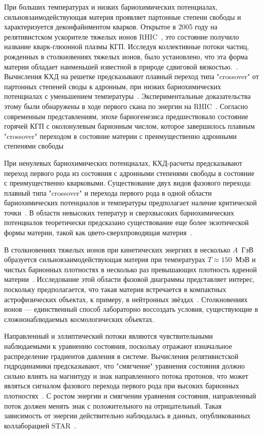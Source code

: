 При больших температурах и низких бариохимических потенциалах, сильновзаимодействующая материя проявляет партонные степени свободы и характеризуется деконфайнментом кварков. 
Открытое в 2005 году на релятивистском ускорителе тяжелых ионов RHIC~\cite{STAR:2005gfr}, это состояние получило название кварк-глюонной плазмы КГП.
Исследуя коллективные потоки частиц, рожденных в столкновениях тяжелых ионов, было установлено, что эта форма материи обладает наименьшей известной в природе сдвиговой вязкостью.~\cite{Shen:2015msa}.
Вычисления КХД на решетке предсказывают плавный переход типа "crossover" от партонных степеней своды к адронным, при низких бариохимических потенциалах с уменьшением температуры~\cite{HotQCD:2014kol, Karsch:2003va}.
Экспериментальные доказательства этому были обнаружены в ходе первого скана по энергии на RHIC~\cite{Odyniec:2019kfh}.
Согласно современным представлениям, эпохе бариогенезиса предшествовало состояние горячей КГП с околонулевым барионным числом, которое завершилось плавным "crossover" переходом в состояние материи с преимущественно адронными степенями свободы~\cite{Esumi:2022uas}

При ненулевых бариохимических потенциалах, КХД-расчеты предсказывают переход первого рода из состояния с адронными степенями свободы в состояние с преимущественно кварковыми.
Существование двух видов фазового перехода: плавный типа "crossover" и перехода первого рода в одной области бариохимических потенциалов и температуры предполагает наличие критической точки~\cite{Odyniec:2019kfh}.
В области невысоких теператур и сверхвысоких бариохимических потенциалов теоретически предсказано существование еще более экзотической формы материи, такой как цвето-сверхпроводящая материя~\cite{McLerran:2008ux}.

В столкновениях тяжелых ионов при кинетических энергиях в несколько $A$~ГэВ образуется сильновзаимодействующая материя при температурах $T\approx150$~МэВ и чистых барионных плотностях в несколько раз превышающих плотность ядреной материи~\cite{Adamczewski-Musch:2019byl}.
Исследование этой области фазовой диаграммы представляет интерес, поскольку предполагается, что такая материя встречается в компактных астрофизических объектах, к примеру, в нейтронных звёздах~\cite{Danielewicz:2002pu}.
Столкновениях ионов --- единственный способ лабораторно воссоздать условия, существующие в сложнонаблюдаемых космологических объектах.

Направленный и эллиптический потоки являются чувствительными наблюдаемыми к уравнению состояния, поскольку отражают изначальное распределение градиентов давления в системе.
Вычисления релятивистской гидродинамики предсказывают, что "смягчение" уравнения состояния должно сильно влиять на магнитуду и знак направленного потока протонов, что может являться сигналом фазового перехода первого рода при высоких барионных плотностях~\cite{Rischke:1995pe, Stoecker:2004qu}.
С ростом энергии и смягчении уравнения состояния, направленный поток должен менять знак с положительного на отрицательный.
Такая зависимость от энергии действительно наблюдалась в данных, опубликованных коллаборацией STAR~\cite{STAR:2014clz}.

